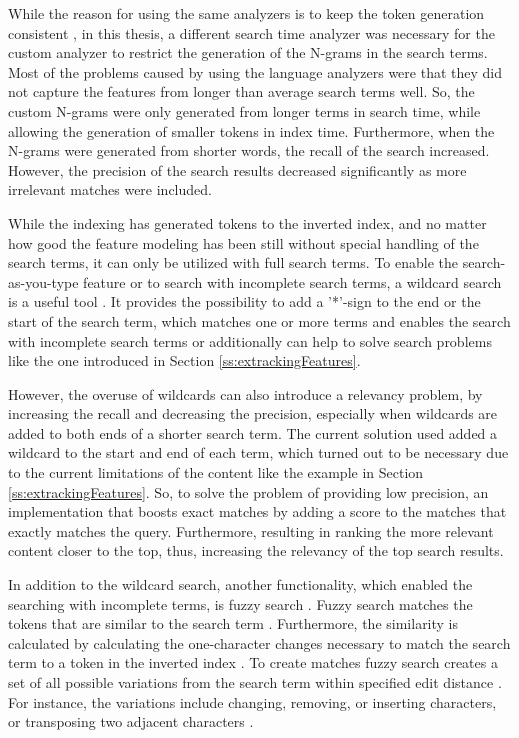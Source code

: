 While the reason for using the same analyzers is to keep the token generation consistent \cite{relevantSearch}, 
in this thesis, a different search time analyzer was necessary for the custom analyzer to restrict 
the generation of the N-grams in the search terms. 
Most of the problems caused by using the language analyzers were that they did not capture the features
from longer than average search terms well.
So, the custom N-grams were only generated from longer terms in search time, 
while allowing the generation of smaller tokens in index time.
Furthermore, when the N-grams were generated from shorter words, the recall of the search increased.
However, the precision of the search results decreased significantly as more irrelevant matches were included.


While the indexing has generated tokens to the inverted index, and no matter how good the feature modeling has been
still without special handling of the search terms, it can only be utilized with full search terms.
To enable the search-as-you-type feature or to search with incomplete search terms, a wildcard search is 
a useful tool \cite{relevantSearch}.
It provides the possibility to add a '*'-sign to the end or the start of the search term, which matches one or more
terms and enables the search with incomplete search terms or additionally can help to solve search problems like
the one introduced in Section \ref{ss:extrackingFeatures}.


However, the overuse of wildcards can also introduce a relevancy problem, by increasing the recall and decreasing 
the precision, especially when wildcards are added to both ends of a shorter search term. 
The current solution used added a wildcard to the start and end of each term, which turned out to be necessary
due to the current limitations of the content like the example in Section \ref{ss:extrackingFeatures}.
So, to solve the problem of providing low precision, an implementation that boosts exact matches 
by adding a score to the matches that exactly matches the query.
Furthermore, resulting in ranking the more relevant content closer to the top, thus, increasing
the relevancy of the top search results.


In addition to the wildcard search, another functionality, which enabled the searching with incomplete terms, 
is fuzzy search \cite{relevantSearch}.
Fuzzy search matches the tokens that are similar to the search term \cite{elasticIntro}. 
Furthermore, the similarity is calculated by calculating the one-character 
changes necessary to match the search term to a token in the inverted index \cite{elasticIntro}.
To create matches fuzzy search creates a set of all possible variations from the search term within
specified edit distance \cite{elasticIntro}.
For instance, the variations include changing, removing, or inserting characters, or transposing two adjacent characters 
\cite{elasticIntro}.


